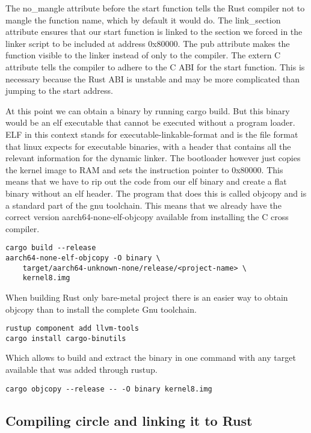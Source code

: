 The no\_mangle attribute before the start function tells the Rust compiler not to mangle the function name, which by default it would do.
The link\_section attribute ensures that our start function is linked to the section we forced in the linker script to be included at address 0x80000.
The pub attribute makes the function visible to the linker instead of only to the compiler.
The extern C attribute tells the compiler to adhere to the C ABI for the start function.
This is necessary because the Rust ABI is unstable and may be more complicated than jumping to the start address.

At this point we can obtain a binary by running cargo build.
But this binary would be an elf executable that cannot be executed without a program loader.
ELF in this context stands for executable-linkable-format and is the file format that linux expects for executable binaries,
with a header that contains all the relevant information for the dynamic linker.
The bootloader however just copies the kernel image to RAM and sets the instruction pointer to 0x80000.
This means that we have to rip out the code from our elf binary and create a flat binary without an elf header.
The program that does this is called objcopy and is a standard part of the gnu toolchain.
This means that we already have the correct version aarch64-none-elf-objcopy available from installing the C cross compiler.

\begin{verbatim}
cargo build --release
aarch64-none-elf-objcopy -O binary \
    target/aarch64-unknown-none/release/<project-name> \
    kernel8.img
\end{verbatim}

When building Rust only bare-metal project there is an easier way to obtain objcopy than to install the complete Gnu toolchain.
\begin{verbatim}
rustup component add llvm-tools
cargo install cargo-binutils
\end{verbatim}
Which allows to build and extract the binary in one command with any target available that was added through rustup.
\begin{verbatim}
cargo objcopy --release -- -O binary kernel8.img
\end{verbatim}

\subsection{Compiling circle and linking it to Rust}
\label{sec:concept_and_implementation:bare-metal:ffi}

